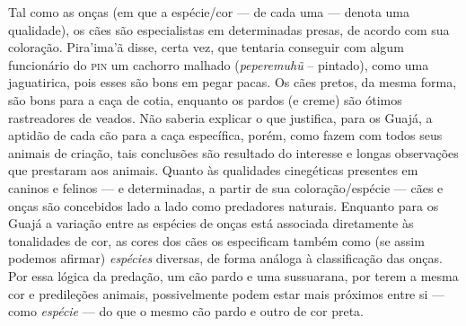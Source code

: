 Tal como as onças (em que a espécie/cor --- de cada uma --- denota uma
qualidade), os cães são especialistas em determinadas presas, de acordo
com sua coloração. Pira'ima'ã disse, certa vez, que tentaria conseguir
com algum funcionário do \textsc{pin} um cachorro malhado (\emph{peperemuhũ} --
pintado), como uma jaguatirica, pois esses são bons em pegar pacas. Os
cães pretos, da mesma forma, são bons para a caça de cotia, enquanto os
pardos (e creme) são ótimos rastreadores de veados. Não saberia explicar
o que justifica, para os Guajá, a aptidão de cada cão para a caça
específica, porém, como fazem com todos seus animais de criação, tais
conclusões são resultado do interesse e longas observações que prestaram
aos animais. Quanto às qualidades cinegéticas presentes em caninos e
felinos --- e determinadas, a partir de sua coloração/espécie --- cães e
onças são concebidos lado a lado como predadores naturais. Enquanto para
os Guajá a variação entre as espécies de onças está associada
diretamente às tonalidades de cor, as cores dos cães os especificam
também como (se assim podemos afirmar) \emph{espécies} diversas, de
forma análoga à classificação das onças. Por essa lógica da predação, um
cão pardo e uma sussuarana, por terem a mesma cor e predileções animais,
possivelmente podem estar mais próximos entre si --- como \emph{espécie} ---
do que o mesmo cão pardo e outro de cor preta.

